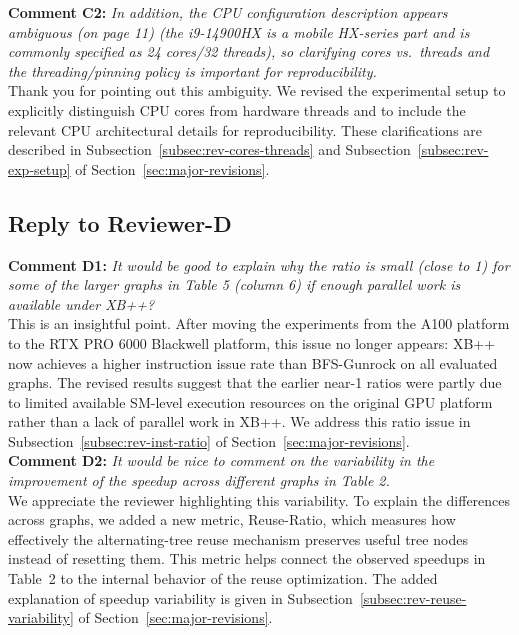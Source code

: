 \noindent\textbf{Comment C2:} \textit{In addition, the CPU configuration description appears ambiguous (on page 11) (the i9-14900HX is a mobile HX-series part and is commonly specified as 24 cores/32 threads), so clarifying cores vs.\ threads and the threading/pinning policy is important for reproducibility.}
\\

\noindent Thank you for pointing out this ambiguity. We revised the experimental setup to explicitly distinguish CPU cores from hardware threads and to include the relevant CPU architectural details for reproducibility. These clarifications are described in Subsection~\ref{subsec:rev-cores-threads} and Subsection~\ref{subsec:rev-exp-setup} of Section~\ref{sec:major-revisions}.
\\

\subsection{Reply to Reviewer-D}

\noindent\textbf{Comment D1:} \textit{It would be good to explain why the ratio is small (close to 1) for some of the larger graphs in Table 5 (column 6) if enough parallel work is available under XB++?}
\\

\noindent This is an insightful point. After moving the experiments from the A100 platform to the RTX PRO 6000 Blackwell platform, this issue no longer appears: XB++ now achieves a higher instruction issue rate than BFS-Gunrock on all evaluated graphs. The revised results suggest that the earlier near-1 ratios were partly due to limited available SM-level execution resources on the original GPU platform rather than a lack of parallel work in XB++. We address this ratio issue in Subsection~\ref{subsec:rev-inst-ratio} of Section~\ref{sec:major-revisions}.
\\

\noindent\textbf{Comment D2:} \textit{It would be nice to comment on the variability in the improvement of the speedup across different graphs in Table 2.}
\\

\noindent We appreciate the reviewer highlighting this variability. To explain the differences across graphs, we added a new metric, Reuse-Ratio, which measures how effectively the alternating-tree reuse mechanism preserves useful tree nodes instead of resetting them. This metric helps connect the observed speedups in Table~2 to the internal behavior of the reuse optimization. The added explanation of speedup variability is given in Subsection~\ref{subsec:rev-reuse-variability} of Section~\ref{sec:major-revisions}.
\\

